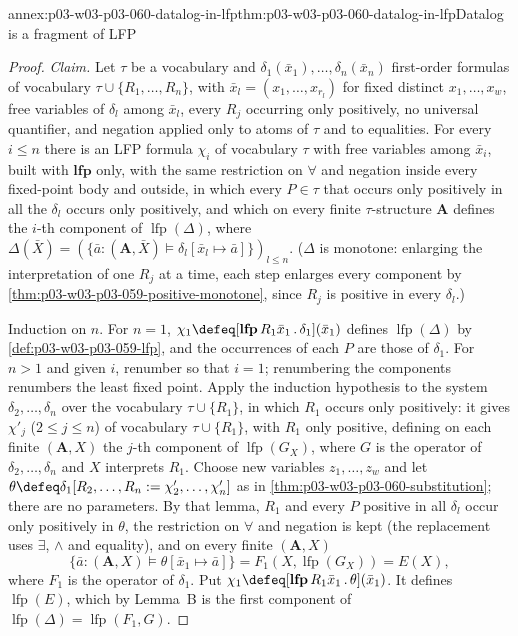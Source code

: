 \begin{annexitem}{annex:p03-w03-p03-060-datalog-in-lfp}{thm:p03-w03-p03-060-datalog-in-lfp}{Datalog is a fragment of LFP}
\begin{proof}
\emph{Claim.} Let \(\tau\) be a vocabulary and
\(\delta_1(\bar x_1),\ldots,\delta_n(\bar x_n)\) first-order formulas of
vocabulary \(\tau\cup\{R_1,\ldots,R_n\}\), with
\(\bar x_l=(x_1,\ldots,x_{r_l})\) for fixed distinct \(x_1,\ldots,x_w\),
free variables of \(\delta_l\) among \(\bar x_l\), every \(R_j\) occurring
only positively, no universal quantifier, and negation applied only to
atoms of \(\tau\) and to equalities. For every \(i\le n\) there is an LFP
formula \(\chi_i\) of vocabulary \(\tau\) with free variables among
\(\bar x_i\), built with \(\mathbf{lfp}\) only, with the same restriction
on \(\forall\) and negation inside every fixed-point body and outside, in
which every \(P\in\tau\) that occurs only positively in all the
\(\delta_l\) occurs only positively, and which on every finite
\(\tau\)-structure \(\mathbf A\) defines the \(i\)-th component of
\(\operatorname{lfp}(\Delta)\), where
\(\Delta(\bar X)=(\{\bar a:(\mathbf A,\bar X)\models\delta_l[\bar x_l\mapsto\bar a]\})_{l\le n}\).
(\(\Delta\) is monotone: enlarging the interpretation of one \(R_j\) at a
time, each step enlarges every component by
\cref{thm:p03-w03-p03-059-positive-monotone}, since \(R_j\) is positive in
every \(\delta_l\).)

Induction on \(n\). For \(n=1\), \(\chi_1\defeq[\mathbf{lfp}\,R_1\bar x_1\,.\,\delta_1](\bar x_1)\)
defines \(\operatorname{lfp}(\Delta)\) by \cref{def:p03-w03-p03-059-lfp},
and the occurrences of each \(P\) are those of \(\delta_1\). For \(n>1\)
and given \(i\), renumber so that \(i=1\); renumbering the components
renumbers the least fixed point. Apply the induction hypothesis to the
system \(\delta_2,\ldots,\delta_n\) over the vocabulary
\(\tau\cup\{R_1\}\), in which \(R_1\) occurs only positively: it gives
\(\chi'_j\) (\(2\le j\le n\)) of vocabulary \(\tau\cup\{R_1\}\), with
\(R_1\) only positive, defining on each finite \((\mathbf A,X)\) the
\(j\)-th component of \(\operatorname{lfp}(G_X)\), where \(G\) is the
operator of \(\delta_2,\ldots,\delta_n\) and \(X\) interprets \(R_1\). Choose
new variables \(z_1,\ldots,z_w\) and let
\(\theta\defeq\delta_1[R_2,\ldots,R_n:=\chi'_2,\ldots,\chi'_n]\) as in
\cref{thm:p03-w03-p03-060-substitution}; there are no parameters. By that
lemma, \(R_1\) and every \(P\) positive in all \(\delta_l\) occur only
positively in \(\theta\), the restriction on \(\forall\) and negation is
kept (the replacement uses \(\exists\), \(\wedge\) and equality), and on
every finite \((\mathbf A,X)\)
\[
 \{\bar a:(\mathbf A,X)\models\theta[\bar x_1\mapsto\bar a]\}
 =F_1(X,\operatorname{lfp}(G_X))=E(X),
\]
where \(F_1\) is the operator of \(\delta_1\). Put
\(\chi_1\defeq[\mathbf{lfp}\,R_1\bar x_1\,.\,\theta](\bar x_1)\). It
defines \(\operatorname{lfp}(E)\), which by Lemma~B is the first component
of \(\operatorname{lfp}(\Delta)=\operatorname{lfp}(F_1,G)\).


\end{proof}
\end{annexitem}
